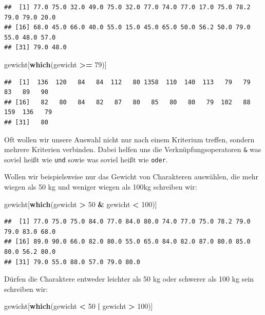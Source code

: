 \documentclass[
]{book}
\newenvironment{Shaded}{\begin{snugshade}}{\end{snugshade}}
\newcommand{\DecValTok}[1]{\textcolor[rgb]{0.00,0.00,0.81}{#1}}
\newcommand{\FunctionTok}[1]{\textcolor[rgb]{0.13,0.29,0.53}{\textbf{#1}}}
\newcommand{\NormalTok}[1]{#1}
\newcommand{\SpecialCharTok}[1]{\textcolor[rgb]{0.81,0.36,0.00}{\textbf{#1}}}
\begin{document}
\begin{verbatim}
##  [1] 77.0 75.0 32.0 49.0 75.0 32.0 77.0 74.0 77.0 17.0 75.0 78.2 79.0 79.0 20.0
## [16] 68.0 45.0 66.0 40.0 55.0 15.0 45.0 65.0 50.0 56.2 50.0 79.0 55.0 48.0 57.0
## [31] 79.0 48.0
\end{verbatim}

\begin{Shaded}
\begin{Highlighting}[]
\NormalTok{gewicht[}\FunctionTok{which}\NormalTok{(gewicht }\SpecialCharTok{\textgreater{}=} \DecValTok{79}\NormalTok{)]}
\end{Highlighting}
\end{Shaded}

\begin{verbatim}
##  [1]  136  120   84   84  112   80 1358  110  140  113   79   79   83   89   90
## [16]   82   80   84   82   87   80   85   80   80   79  102   88  159  136   79
## [31]   80
\end{verbatim}

Oft wollen wir unsere Auswahl nicht nur nach einem Kriterium treffen, sondern mehrere Kriterien verbinden. Dabei helfen uns die Verknüpfungsoperatoren \texttt{\&} was soviel heißt wie \texttt{und} sowie \texttt{\textbar{}} was soviel heißt wie \texttt{oder}.

Wollen wir beispielsweise nur das Gewicht von Charakteren auswählen, die mehr wiegen als 50 kg und weniger wiegen als 100kg schreiben wir:

\begin{Shaded}
\begin{Highlighting}[]
\NormalTok{gewicht[}\FunctionTok{which}\NormalTok{(gewicht }\SpecialCharTok{\textgreater{}} \DecValTok{50} \SpecialCharTok{\&}\NormalTok{ gewicht }\SpecialCharTok{\textless{}} \DecValTok{100}\NormalTok{)]}
\end{Highlighting}
\end{Shaded}

\begin{verbatim}
##  [1] 77.0 75.0 75.0 84.0 77.0 84.0 80.0 74.0 77.0 75.0 78.2 79.0 79.0 83.0 68.0
## [16] 89.0 90.0 66.0 82.0 80.0 55.0 65.0 84.0 82.0 87.0 80.0 85.0 80.0 56.2 80.0
## [31] 79.0 55.0 88.0 57.0 79.0 80.0
\end{verbatim}

Dürfen die Charaktere entweder leichter als 50 kg oder schwerer als 100 kg sein schreiben wir:

\begin{Shaded}
\begin{Highlighting}[]
\NormalTok{gewicht[}\FunctionTok{which}\NormalTok{(gewicht }\SpecialCharTok{\textless{}} \DecValTok{50} \SpecialCharTok{|}\NormalTok{ gewicht }\SpecialCharTok{\textgreater{}} \DecValTok{100}\NormalTok{)]}
\end{Highlighting}
\end{Shaded}
\end{document}
